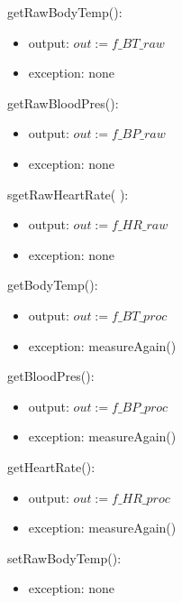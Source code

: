 \documentclass{article}
\begin{document}
\begin{description}
        \noindent getRawBodyTemp():
        \begin{itemize}
        \item output: $out := \mathit{f\_BT\_raw}$
        \item exception: none
        \end{itemize}
        
        \noindent getRawBloodPres():
        \begin{itemize}
        \item output: $out := \mathit{f\_BP\_raw}$
        \item exception: none
        \end{itemize}
        
        s\noindent getRawHeartRate( ):
        \begin{itemize}
        \item output: $out := \mathit{f\_HR\_raw}$
        \item exception: none
        \end{itemize}
        
        \noindent getBodyTemp():
        \begin{itemize}
        \item output: $out := \mathit{f\_BT\_proc}$
        \item exception: measureAgain()
        \end{itemize}
        
        \noindent getBloodPres():
        \begin{itemize}
        \item output: $out := \mathit{f\_BP\_proc}$
        \item exception: measureAgain()
        \end{itemize}
        
        \noindent getHeartRate():
        \begin{itemize}
        \item output: $out := \mathit{f\_HR\_proc}$
        \item exception: measureAgain()
        \end{itemize}
        
        \noindent setRawBodyTemp():
        \begin{itemize}
        
        \item exception: none
        \end{itemize}
        

\end{description}
\end{document}
